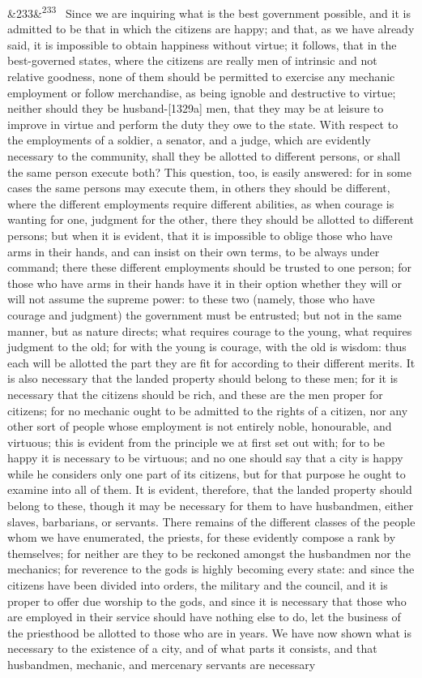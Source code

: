 \documentclass[12pt]{article}
\newcommand{\para}[1][]{\par\noindent\ifx&#1&\else\textsuperscript{\footnotesize #1}~\fi}
\begin{document}
\para[233] Since we are inquiring what is the best government possible, and it is admitted to be that in which the citizens are happy; and that, as we have already said, it is impossible to obtain happiness without virtue; it follows, that in the best-governed states, where the citizens are really men of intrinsic and not relative goodness, none of them should be permitted to exercise any mechanic employment or follow merchandise, as being ignoble and destructive to virtue; neither should they be husband-[1329a] men, that they may be at leisure to improve in virtue and perform the duty they owe to the state. With respect to the employments of a soldier, a senator, and a judge, which are evidently necessary to the community, shall they be allotted to different persons, or shall the same person execute both? This question, too, is easily answered: for in some cases the same persons may execute them, in others they should be different, where the different employments require different abilities, as when courage is wanting for one, judgment for the other, there they should be allotted to different persons; but when it is evident, that it is impossible to oblige those who have arms in their hands, and can insist on their own terms, to be always under command; there these different employments should be trusted to one person; for those who have arms in their hands have it in their option whether they will or will not assume the supreme power: to these two (namely, those who have courage and judgment) the government must be entrusted; but not in the same manner, but as nature directs; what requires courage to the young, what requires judgment to the old; for with the young is courage, with the old is wisdom: thus each will be allotted the part they are fit for according to their different merits. It is also necessary that the landed property should belong to these men; for it is necessary that the citizens should be rich, and these are the men proper for citizens; for no mechanic ought to be admitted to the rights of a citizen, nor any other sort of people whose employment is not entirely noble, honourable, and virtuous; this is evident from the principle we at first set out with; for to be happy it is necessary to be virtuous; and no one should say that a city is happy while he considers only one part of its citizens, but for that purpose he ought to examine into all of them. It is evident, therefore, that the landed property should belong to these, though it may be necessary for them to have husbandmen, either slaves, barbarians, or servants. There remains of the different classes of the people whom we have enumerated, the priests, for these evidently compose a rank by themselves; for neither are they to be reckoned amongst the husbandmen nor the mechanics; for reverence to the gods is highly becoming every state: and since the citizens have been divided into orders, the military and the council, and it is proper to offer due worship to the gods, and since it is necessary that those who are employed in their service should have nothing else to do, let the business of the priesthood be allotted to those who are in years. We have now shown what is necessary to the existence of a city, and of what parts it consists, and that husbandmen, mechanic, and mercenary servants are necessary 
\end{document}
